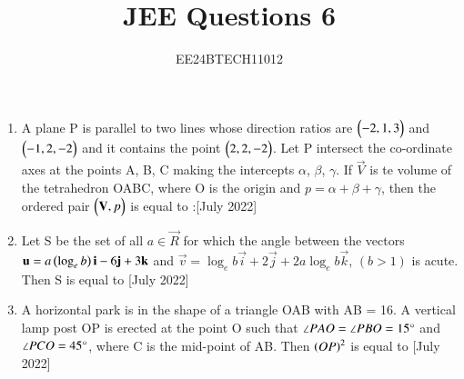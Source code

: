 \documentclass[journal,12pt,onecolumn]{IEEEtran}
\theoremstyle{remark}
\begin{document}

\vspace{3cm}

\title{JEE Questions 6}
\author{EE24BTECH11012}
\maketitle
\newpage
\bigskip

\renewcommand{\thefigure}{\theenumi}
\renewcommand{\thetable}{\theenumi}
\begin{enumerate}
	\item A plane P is parallel to two lines whose direction ratios are $\begin{pmatrix}-2,1,3\end{pmatrix}$ and $\begin{pmatrix}-1,2,-2\end{pmatrix}$ and it contains the point $\begin{pmatrix}2,2,-2\end{pmatrix}$. Let P intersect the co-ordinate axes at the points A, B, C making the intercepts $\alpha$, $\beta$, $\gamma$. If $\vec{V}$ is te volume of the tetrahedron OABC, where O is the origin and $p=\alpha + \beta + \gamma$, then the ordered pair $\begin{pmatrix}\mathbf{V}, p\end{pmatrix}$ is equal to :\hfill{[July 2022]}
		\begin{enumerate}
		\end{enumerate}
	\item Let S be the set of all $ a \in \vec{R}$ for which the angle between the vectors $\mathbf{u} = a\left(\log_{e}{b}\right)\mathbf{i} -6\mathbf{j} + 3\mathbf{k}$ and $\vec{v} = \log_{e}{b}\vec{i} + 2\vec{j} + 2a\log_{e}{b}\vec{k}$, $(b>1)$ is acute. Then S is equal to \hfill{[July 2022]}
		\begin{enumerate}
				\begin{multicols}{4}
				\item $\brak{-\infty, -\frac{4}{3}}$
				\item $ \phi $
				\item $\brak{-\frac{4}{3}, 0}$
				\item $\brak{\frac{12}{7}, \infty}$
				\end{multicols}
		\end{enumerate}
	\item A horizontal park is in the shape of a triangle OAB with AB = 16. A vertical lamp post OP is erected at the point O such that $\angle{PAO} = \angle{PBO} = 15 \degree$ and $\angle{PCO} = 45\degree$, where C is the mid-point of AB. Then $\left(OP\right)^2$ is equal to \hfill{[July 2022]}

\end{enumerate}
\end{document}
